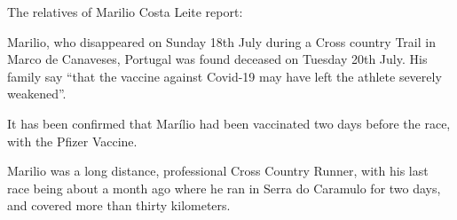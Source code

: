 The relatives of Marilio Costa Leite report:

Marilio, who disappeared on Sunday 18th July during a Cross country Trail in
Marco de Canaveses, Portugal was found deceased on Tuesday 20th July. His family
say “that the vaccine against Covid-19 may have left the athlete severely
weakened”.

It has been confirmed that Marílio had been vaccinated two days before the race,
with the Pfizer Vaccine.

Marilio was a long distance, professional Cross Country Runner, with his last
race being about a month ago where he ran in Serra do Caramulo for two days, and
covered more than thirty kilometers.

